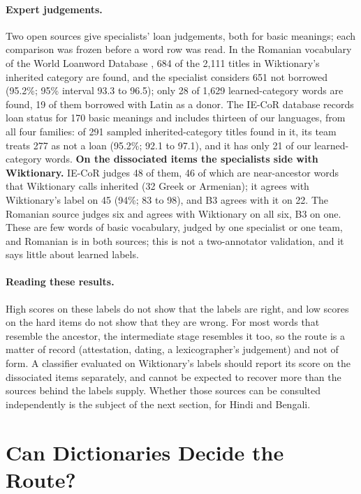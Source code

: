 \documentclass[11pt]{article}
\begin{document}
\paragraph{Expert judgements.} Two open sources give specialists' loan judgements, both for basic meanings; each comparison was frozen before a word row was read. In the Romanian vocabulary of the World Loanword Database \citep{schulte2009romanian}, 684 of the 2,111 titles in Wiktionary's inherited category are found, and the specialist considers 651 not borrowed (95.2\%; 95\% interval 93.3 to 96.5); only 28 of 1,629 learned-category words are found, 19 of them borrowed with Latin as a donor. The IE-CoR database \citep{heggarty2024iecor} records loan status for 170 basic meanings and includes thirteen of our languages, from all four families: of 291 sampled inherited-category titles found in it, its team treats 277 as not a loan (95.2\%; 92.1 to 97.1), and it has only 21 of our learned-category words. \textbf{On the dissociated items the specialists side with Wiktionary.} IE-CoR judges 48 of them, 46 of which are near-ancestor words that Wiktionary calls inherited (32 Greek or Armenian); it agrees with Wiktionary's label on 45 (94\%; 83 to 98), and B3 agrees with it on 22. The Romanian source judges six and agrees with Wiktionary on all six, B3 on one. These are few words of basic vocabulary, judged by one specialist or one team, and Romanian is in both sources; this is not a two-annotator validation, and it says little about learned labels.

\paragraph{Reading these results.} High scores on these labels do not show that the labels are right, and low scores on the hard items do not show that they are wrong. For most words that resemble the ancestor, the intermediate stage resembles it too, so the route is a matter of record (attestation, dating, a lexicographer's judgement) and not of form. A classifier evaluated on Wiktionary's labels should report its score on the dissociated items separately, and cannot be expected to recover more than the sources behind the labels supply. Whether those sources can be consulted independently is the subject of the next section, for Hindi and Bengali.

\section{Can Dictionaries Decide the Route?}
\label{sec:why}
\end{document}
